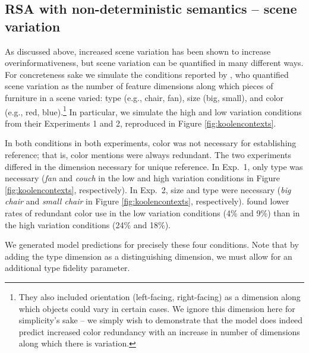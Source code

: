 \documentclass[11pt]{article}
\newcommand{\figref}[1]{Figure \ref{#1}}
\begin{document}
\subsection{RSA with non-deterministic semantics -- scene variation}
\label{sec:modelkoolen}

As discussed above, increased scene variation has been shown to increase overinformativeness, but scene variation can be quantified in many different ways. For concreteness sake we simulate the conditions reported by , who quantified scene variation as the number of feature dimensions along which pieces of furniture in a scene varied: type (e.g., chair, fan), size (big, small), and color (e.g., red, blue).\footnote{They also included orientation (left-facing, right-facing) as a dimension along which objects could vary in certain cases. We ignore this dimension here for simplicity's sake -- we simply wish to demonstrate that the model does indeed predict increased color redundancy with an increase in number of dimensions along which there is variation.} In particular, we  simulate the high and low variation conditions from their Experiments 1 and 2, reproduced in \figref{fig:koolencontexts}. 

In both conditions in both experiments, color was not necessary for establishing reference; that is, color mentions were always redundant. The two experiments differed in the dimension necessary for unique reference. In Exp.~1, only type was necessary (\emph{fan} and \emph{couch} in the low and high variation conditions in \figref{fig:koolencontexts}, respectively). In Exp.~2, size and type were necessary (\emph{big chair} and \emph{small chair} in \figref{fig:koolencontexts}, respectively).  found lower rates of redundant color use in the low variation conditions (4\% and 9\%) than in the high variation conditions (24\% and 18\%).

We generated model predictions for precisely these four conditions. Note that by adding the type dimension as a distinguishing dimension, we must allow for an additional type fidelity parameter.
\end{document}
